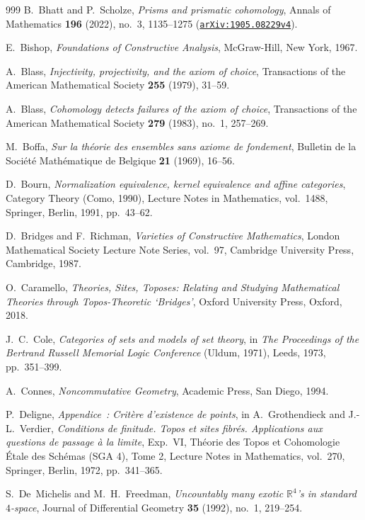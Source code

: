 \documentclass[10pt,twoside,openright]{book}
\theoremstyle{crmplain}
\theoremstyle{crmdef}
\theoremstyle{crmremark}
\begin{document}
\begin{thebibliography}{999}
B.~Bhatt and P.~Scholze,
\emph{Prisms and prismatic cohomology},
Annals of Mathematics \textbf{196} (2022), no.~3, 1135--1275 (\href{https://arxiv.org/abs/1905.08229v4}{\texttt{arXiv:1905.08229v4}}).

E.~Bishop,
\emph{Foundations of Constructive Analysis},
McGraw-Hill, New York, 1967.

A.~Blass,
\emph{Injectivity, projectivity, and the axiom of choice},
Transactions of the American Mathematical Society \textbf{255} (1979), 31--59.

A.~Blass,
\emph{Cohomology detects failures of the axiom of choice},
Transactions of the American Mathematical Society \textbf{279} (1983), no.~1, 257--269.

M.~Boffa,
\emph{Sur la th\'eorie des ensembles sans axiome de fondement},
Bulletin de la Soci\'et\'e Math\'ematique de Belgique \textbf{21} (1969), 16--56.

D.~Bourn,
\emph{Normalization equivalence, kernel equivalence and affine categories},
Category Theory (Como, 1990), Lecture Notes in Mathematics, vol.~1488, Springer, Berlin, 1991, pp.~43--62.

D.~Bridges and F.~Richman,
\emph{Varieties of Constructive Mathematics},
London Mathematical Society Lecture Note Series, vol.~97, Cambridge University Press, Cambridge, 1987.

O.~Caramello,
\emph{Theories, Sites, Toposes: Relating and Studying Mathematical Theories through Topos-Theoretic `Bridges'},
Oxford University Press, Oxford, 2018.

J.~C.~Cole,
\emph{Categories of sets and models of set theory},
in \emph{The Proceedings of the Bertrand Russell Memorial Logic Conference} (Uldum, 1971), Leeds, 1973, pp.~351--399.

A.~Connes,
\emph{Noncommutative Geometry},
Academic Press, San Diego, 1994.

P.~Deligne,
\emph{Appendice~: Crit\`ere d'existence de points},
in A.~Grothendieck and J.-L.~Verdier, \emph{Conditions de finitude. Topos et sites fibr\'es. Applications aux questions de passage \`a la limite}, Exp.~VI, Th\'eorie des Topos et Cohomologie \'Etale des Sch\'emas (SGA 4), Tome 2, Lecture Notes in Mathematics, vol.~270, Springer, Berlin, 1972, pp.~341--365.

S.~De~Michelis and M.~H.~Freedman,
\emph{Uncountably many exotic $\mathbb{R}^4$'s in standard $4$-space},
Journal of Differential Geometry \textbf{35} (1992), no.~1, 219--254.


\end{thebibliography}
\end{document}
